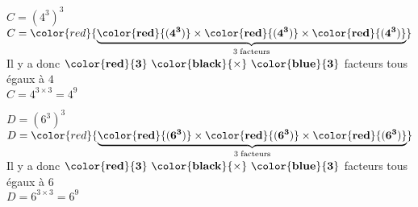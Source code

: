             \begin{itemize}
                \def\item{} %
                \item $C=\left(4^3\right)^{3}$\\
                $C=\color{red}{\underbrace{\mathbf{\color{red}{(4^3)}} \times \mathbf{\color{red}{(4^3)}}\times \mathbf{\color{red}{(4^3)}}}_{3\thickspace\text{facteurs}}}$\\
                Il y a donc $\mathbf{\color{red}{3}~\color{black}{\times}~\color{blue}{3}}$ facteurs tous égaux à $4$\\
                $C=4^{3\times3} = 4^{9}$

                \bigskip
                \item $D=\left(6^3\right)^{3}$\\
                $D=\color{red}{\underbrace{\mathbf{\color{red}{(6^3)}} \times \mathbf{\color{red}{(6^3)}}\times \mathbf{\color{red}{(6^3)}}}_{3\thickspace\text{facteurs}}}$\\
                Il y a donc $\mathbf{\color{red}{3}~\color{black}{\times}~\color{blue}{3}}$ facteurs tous égaux à $6$\\
                $D=6^{3\times3} = 6^{9}$
            \end{itemize}

